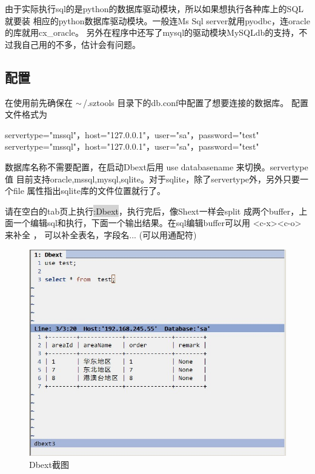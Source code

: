 \documentclass[oneside,openany]{book}
\begin{document}
由于实际执行sql的是python的数据库驱动模块，所以如果想执行各种库上的SQL就要装
相应的python数据库驱动模块。一般连Ms Sql server就用pyodbc，连oracle的库就用cx\_oracle。
另外在程序中还写了mysql的驱动模块MySQLdb的支持，不过我自己用的不多，估计会有问题。

\subsection{配置}
   在使用前先确保在 $\tiny{\sim}$/.sztools 目录下的db.conf中配置了想要连接的数据库。
   配置文件格式为
    \begin{mdframed}[style=SmallFrame]
    \begin{flushleft}
    servertype="mssql"，host="127.0.0.1"，user="sa"，password="test"\newline
    servertype="mssql"，host="127.0.0.1"，user="sa"，password="test"
    \end{flushleft}
    \end{mdframed}
    数据库名称不需要配置，在启动Dbext后用 use databasename 来切换。servertype值
目前支持oracle,mssql,mysql,sqlite。对于sqlite，除了servertype外，另外只要一个file
属性指出sqlite库的文件位置就行了。

    请在空白的tab页上执行\colorbox{lightgray}{:Dbext}，执行完后，像Shext一样会split
成两个buffer，上面一个编辑sql和执行，下面一个输出结果。在sql编辑buffer可以用 
<c-x><c-o> 来补全 ， 可以补全表名，字段名... (可以用通配符) 

  \begin{figure}[htbp]%
  \centering
  \includegraphics[scale=0.5]{dbext.jpg}
  \caption{Dbext截图}
  \end{figure}
\end{document}
